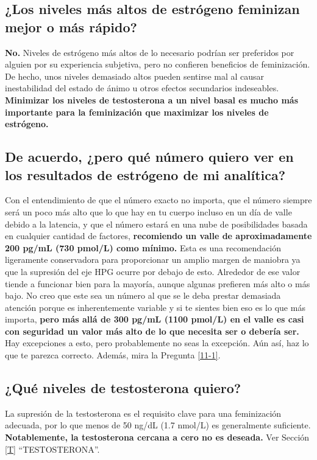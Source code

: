 \documentclass{article}
\begin{document}
\subsection{¿Los niveles más altos de estrógeno feminizan mejor o más rápido?}

\textbf{No.} Niveles de estrógeno más altos de lo necesario podrían ser preferidos por alguien por su experiencia subjetiva, pero no confieren beneficios de feminización. De hecho, unos niveles demasiado altos pueden sentirse mal al causar inestabilidad del estado de ánimo u otros efectos secundarios indeseables. \textbf{Minimizar los niveles de testosterona a un nivel basal es mucho más importante para la feminización que maximizar los niveles de estrógeno.}

\subsection{De acuerdo, ¿pero qué número quiero ver en los resultados de estrógeno de mi analítica?}

Con el entendimiento de que el número exacto no importa, que el número siempre será un poco más alto que lo que hay en tu cuerpo incluso en un día de valle debido a la latencia, y que el número estará en una nube de posibilidades basada en cualquier cantidad de factores, \textbf{recomiendo un valle de aproximadamente 200 pg/mL (730 pmol/L) como mínimo.} Esta es una recomendación ligeramente conservadora para proporcionar un amplio margen de maniobra ya que la supresión del eje HPG ocurre por debajo de esto. Alrededor de ese valor tiende a funcionar bien para la mayoría, aunque algunas prefieren más alto o más bajo. No creo que este sea un número al que se le deba prestar demasiada atención porque es inherentemente variable y si te sientes bien eso es lo que más importa, \textbf{pero más allá de 300 pg/mL (1100 pmol/L) en el valle es casi con seguridad un valor más alto de lo que necesita ser o debería ser.} Hay excepciones a esto, pero probablemente no seas la excepción. Aún así, haz lo que te parezca correcto. Además, mira la Pregunta \ref{11-1}.

\subsection{¿Qué niveles de testosterona quiero?}

La supresión de la testosterona es el requisito clave para una feminización adecuada, por lo que menos de 50 ng/dL (1.7 nmol/L) es generalmente suficiente. \textbf{Notablemente, la testosterona cercana a cero no es deseada.} Ver Sección \ref{T} “TESTOSTERONA”.
\end{document}
